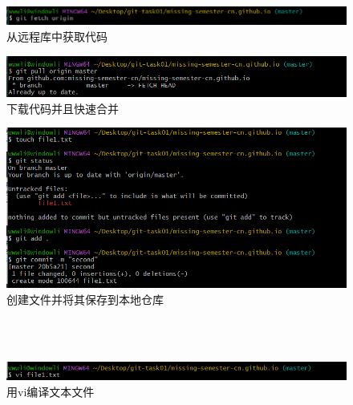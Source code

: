 \documentclass[a4paper, 12pt]{article}
\begin{document}
    
    \begin{figure}[H]
  \centering
  \includegraphics[width=1\textwidth]{屏幕截图 2024-08-28 192431.png}
  \caption{从远程库中获取代码}
    \end{figure}

    
    \begin{figure}[H]
  \centering
  \includegraphics[width=1\textwidth]{屏幕截图 2024-08-28 192444.png}
  \caption{下载代码并且快速合并}
    \end{figure}

     \begin{figure}[H]
  \centering
 
  \includegraphics[width=1\textwidth]{屏幕截图 2024-08-28 194414.png}
     \caption{创建文件并将其保存到本地仓库}
    \end{figure}
\\
\\


 \begin{figure}[H]
  \centering
  \includegraphics[width=1\textwidth]{屏幕截图 2024-08-28 194436.png}
  \caption{用vi编译文本文件}
    \end{figure}
  \\
  \\  
  
\end{document}

